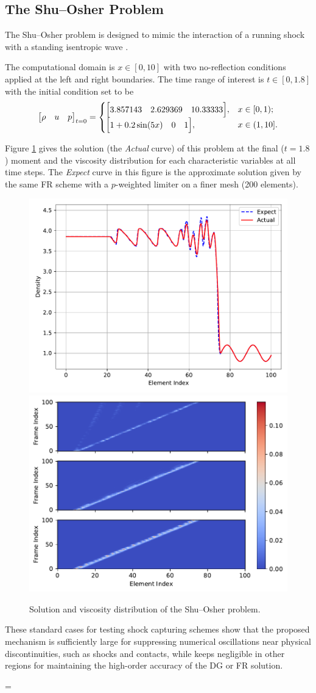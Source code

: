 \documentclass[10pt,draft]{article}
\begin{document}
\subsection{The Shu--Osher Problem}\label{sec:shu_osher}

The Shu--Osher problem is designed to mimic the interaction of a running shock with a standing isentropic wave \cite{Shu_1989}.

The computational domain is $x\in[0, 10]$ with two no-reflection conditions applied at the left and right boundaries.
The time range of interest is $t\in[0, 1.8]$ with the initial condition set to be
\begin{equation}
\mqty[\rho & u & p]_{t=0}
=
\begin{cases}
\mqty[3.857143 & 2.629369 & 10.33333], &x\in[0,1);\\
\mqty[1+0.2\sin(5x) & 0 & 1], &x\in(1,10].
\end{cases}
\end{equation}

Figure \ref{fig:shu_osher} gives the solution (the \emph{Actual} curve) of this problem at the final ($t=1.8$) moment and the viscosity distribution for each characteristic variables at all time steps.
The \emph{Expect} curve in this figure is the approximate solution given by the same FR scheme with a $p$-weighted limiter \cite{Li_2020} on a finer mesh (200 elements).
\begin{figure}[H]
  \centering
  \includegraphics[width=.49\textwidth]{./shu_osher/final/Frame100.pdf}
  \includegraphics[width=.49\textwidth]{./shu_osher/final/Viscosity.pdf}
  \caption{Solution and viscosity distribution of the Shu--Osher problem.}
  \label{fig:shu_osher}
\end{figure}

These standard cases for testing shock capturing schemes show that the proposed mechanism is sufficiently large for suppressing numerical oscillations near physical discontinuities, such as shocks and contacts, while keeps negligible in other regions for maintaining the high-order accuracy of the DG or FR solution.

\bibspacing=


\end{document}
